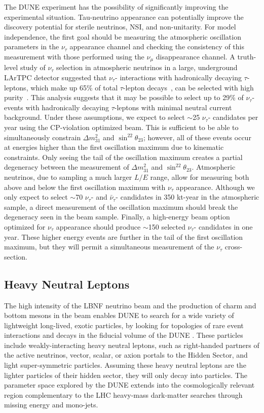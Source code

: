 The DUNE experiment has the possibility of significantly improving the experimental situation.  Tau-neutrino appearance can potentially improve the discovery potential for sterile neutrinos, NSI, and non-unitarity.  For model independence, the first goal should be measuring the atmospheric oscillation parameters in the $\nu_{\tau}$ appearance channel and checking the consistency of this measurement with those performed using the $\nu_{\mu}$ disappearance channel.  A truth-level study of $\nu_{\tau}$ selection in atmospheric neutrinos in a large, underground LArTPC detector suggested that $\nu_{\tau}$- interactions with hadronically decaying $\tau$-leptons, which make up 65\% of total $\tau$-lepton decays~\cite{PDG}, can be selected with high purity~\cite{Conrad:1008}.  This analysis suggests that it may be possible to select up to 29\% of $\nu_{\tau}$- events with hadronically decaying $\tau$-leptons with minimal neutral current background.  Under these assumptions, we expect to select $\sim$25 $\nu_{\tau}$- candidates per year using the CP-violation optimized beam.  This is sufficient to be able to simultaneously constrain $\Delta m^2_{31}$ and $\sin^22\theta_{23}$; however, all of these events occur at energies higher than the first oscillation maximum due to kinematic constraints.  Only seeing the tail of the oscillation maximum creates a partial degeneracy between the measurement of  $\Delta m^2_{31}$ and $\sin^22\theta_{23}$.  Atmospheric neutrinos, due to sampling a much larger $L/E$ range, allow for measuring both above and below the first oscillation maximum with $\nu_{\tau}$ appearance.  Although  we only expect to select $\sim$70 $\nu_{\tau}$- and $\bar{\nu}_{\tau}$- candidates in 350 kt-year in the atmospheric sample,  a direct measurement of the oscillation maximum should break the degeneracy seen in the beam sample.  Finally, a high-energy beam option optimized for $\nu_{\tau}$ appearance should produce $\sim$150 selected  $\nu_{\tau}$- candidates in one year.  These higher energy events are further in the tail of the first oscillation maximum, but they will permit a simultaneous measurement of the $\nu_{\tau}$ cross-section. 

\subsection{Heavy Neutral Leptons}
The high intensity of the LBNF neutrino beam and the production of charm and bottom mesons in the beam enables DUNE to search for a wide variety of lightweight long-lived, exotic particles, by looking for topologies of rare event interactions and decays in the fiducial volume of the DUNE  . These particles include weakly-interacting heavy neutral leptons, such as right-handed partners of the active neutrinos, vector, scalar, or axion portals to the Hidden Sector, and light super-symmetric particles. Assuming these heavy neutral leptons are the lighter particles of their hidden sector, they will only decay into   particles. The parameter space explored by the DUNE   extends into the cosmologically relevant region complementary to the LHC heavy-mass dark-matter searches through missing energy and mono-jets.

